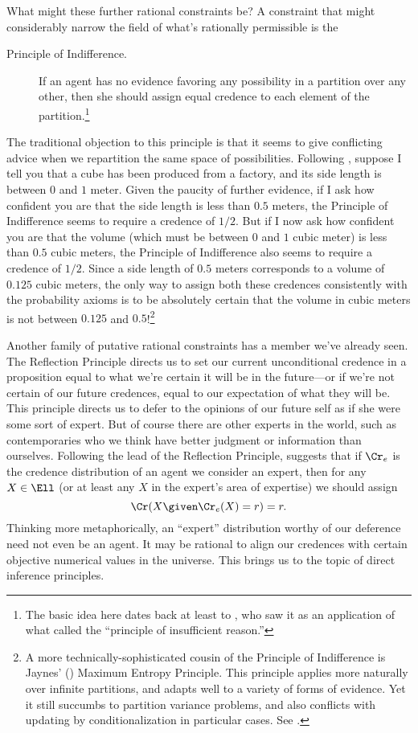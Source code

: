 What might these further rational constraints be? A constraint that might considerably narrow the field of what's rationally permissible is the 
\begin{description}
\item[Principle of Indifference.\,]{If an agent has no evidence favoring any possibility in a partition over any other, then she should assign equal credence to each element of the partition.\footnote
{The basic idea here dates back at least to \citet{LaplaceEssay}, who saw it as an application of what \citet{BernoulliArs} called the ``principle of insufficient reason.''}}
\end{description}
The traditional objection to this principle is that it seems to give conflicting advice when we repartition the same space of possibilities. Following \citet{vanFraassenSymmetry}, suppose I tell you that a cube has been produced from a factory, and its side length is between $0$ and $1$ meter. Given the paucity of further evidence, if I ask how confident you are that the side length is less than $0.5$ meters, the Principle of Indifference seems to require a credence of $1/2$. But if I now ask how confident you are that the volume (which must be between $0$ and $1$ cubic meter) is less than $0.5$ cubic meters, the Principle of Indifference also seems to require a credence of $1/2$. Since a side length of $0.5$ meters corresponds to a volume of $0.125$ cubic meters, the only way to assign both these credences consistently with the probability axioms is to be absolutely certain that the volume in cubic meters is not between $0.125$ and $0.5$!\footnote
{A more technically-sophisticated cousin of the Principle of Indifference is Jaynes' (\citeyear{JaynesI,JaynesII}) Maximum Entropy Principle. This principle applies more naturally over infinite partitions, and adapts well to a variety of forms of evidence. Yet it still succumbs to partition variance problems, and also conflicts with updating by conditionalization in particular cases. See \citet{SeidenfeldEntropy}.}

Another family of putative rational constraints has a member we've already seen. The Reflection Principle directs us to set our current unconditional credence in a proposition equal to what we're certain it will be in the future---or if we're not certain of our future credences, equal to our expectation of what they will be. This principle directs us to defer to the opinions of our future self as if she were some sort of expert. But of course there are other experts in the world, such as contemporaries who we think have better judgment or information than ourselves. Following the lead of the Reflection Principle, \citet{ElgaReflection} suggests that if $\Cr_e$ is the credence distribution of an agent we consider an expert, then for any $X \in \Ell$ (or at least any $X$ in the expert's area of expertise) we should assign
\begin{equation}
\Cr(X \given \Cr_e(X)=r)=r. 
\end{equation}
Thinking more metaphorically, an ``expert'' distribution worthy of our deference need not even be an agent. It may be rational to align our credences with certain objective numerical values in the universe. This brings us to the topic of direct inference principles.


